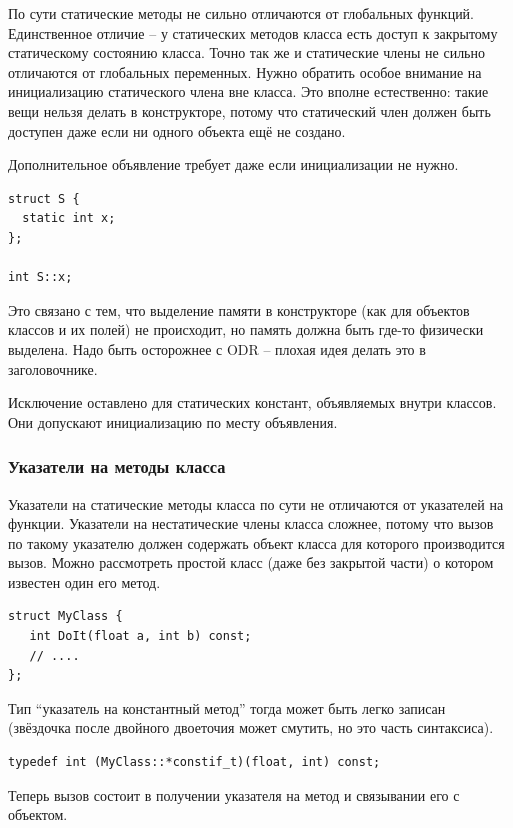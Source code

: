 \documentclass[a4paper,12pt,oneside]{article}
\begin{document}
По сути статические методы не сильно отличаются от глобальных функций. Единственное отличие -- у статических методов класса есть доступ к закрытому статическому состоянию класса. Точно так же и статические члены не сильно отличаются от глобальных переменных. Нужно обратить особое внимание на инициализацию статического члена вне класса. Это вполне естественно: такие вещи нельзя делать в  конструкторе, потому что статический член должен быть доступен даже если ни одного объекта ещё не создано.

Дополнительное объявление требует даже если инициализации не нужно.

\begin{lstlisting}
struct S {
  static int x;
};

int S::x;
\end{lstlisting}

Это связано с тем, что выделение памяти в конструкторе (как для объектов классов и их полей) не происходит, но память должна быть где-то физически выделена. Надо быть осторожнее с ODR -- плохая идея делать это в заголовочнике.

Исключение оставлено для статических констант, объявляемых внутри классов. Они допускают инициализацию по месту объявления.

\subsubsection{Указатели на методы класса}

Указатели на статические методы класса по сути не отличаются от указателей на функции. Указатели на нестатические члены класса сложнее, потому что вызов по такому указателю должен содержать объект класса для которого производится вызов. Можно рассмотреть простой класс (даже без закрытой части) о котором известен один его метод.

\begin{lstlisting}
struct MyClass {
   int DoIt(float a, int b) const;
   // ....
};
\end{lstlisting}

Тип ``указатель на константный метод'' тогда может быть легко записан (звёздочка после двойного двоеточия может смутить, но это часть синтаксиса).

\begin{lstlisting}
typedef int (MyClass::*constif_t)(float, int) const; 
\end{lstlisting}

Теперь вызов состоит в получении указателя на метод и связывании его с объектом.
\end{document}
